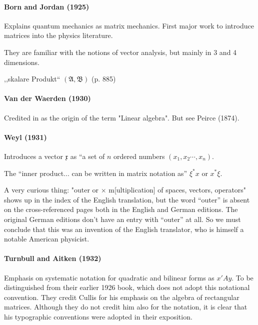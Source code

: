 \paragraph{Born and Jordan (1925)~\cite{Born1925}}

Explains quantum mechanics as matrix mechanics. First major work to introduce matrices into the physics literature.

They are familiar with the notions of vector analysis, but mainly in 3 and 4 dimensions.

,,skalare Produkt`` $(\mathfrak A, \mathfrak B)$ (p. 885)



\paragraph{ Van der Waerden (1930)}

Credited in \cite{Kleiner2007} as the origin of the term "Linear algebra". But see
Peirce (1874).



\paragraph{Weyl (1931)~\cite{Weyl1931}}

Introduces a vector $\mathfrak x$ as ``a set of $n$ ordered numbers $(x_1, x_2 \cdots, x_n)$.

The ``inner product... can be written in matrix notation as''
$\xi^*x$ or $x^*\xi$.

A very curious thing: "outer or $\times$ m[ultiplication] of spaces, vectors, operators" shows up in the index of the English translation, but the word ``outer'' is absent on the cross-referenced pages both in the English and German editions. The original German editions don't have an entry with ``outer'' at all. So we must conclude that this was an invention of the English translator, who is himself a notable American physicist.


\paragraph{Turnbull and Aitken (1932)}

Emphasis on systematic notation for quadratic and bilinear forms as $x'Ay$.
To be distinguished from their earlier 1926 book, which does not adopt this notational convention.
They credit Cullis for his emphasis on the algebra of rectangular matrices. Although they do not credit him also for the notation, it is clear that his typographic conventions were adopted in their exposition.



